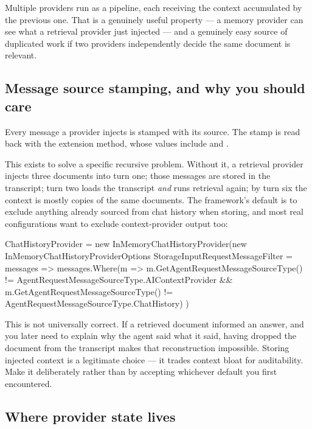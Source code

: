Multiple providers run as a pipeline, each receiving the context accumulated by
the previous one. That is a genuinely useful property --- a memory provider can
see what a retrieval provider just injected --- and a genuinely easy source of
duplicated work if two providers independently decide the same document is
relevant.

\subsection{Message source stamping, and why you should care}

Every message a provider injects is stamped with its source. The stamp is read
back with the  extension method, whose
values include  and .

This exists to solve a specific recursive problem. Without it, a retrieval
provider injects three documents into turn one; those messages are stored in the
transcript; turn two loads the transcript \emph{and} runs retrieval again; by
turn six the context is mostly copies of the same documents. The framework's
default is to exclude anything already sourced from chat history when storing,
and most real configurations want to exclude context-provider output too:

\begin{csharp}[caption={Keeping injected context out of the transcript}, label={lst:source-filter}]
ChatHistoryProvider = new InMemoryChatHistoryProvider(new InMemoryChatHistoryProviderOptions
{
    StorageInputRequestMessageFilter = messages => messages.Where(m =>
        m.GetAgentRequestMessageSourceType() != AgentRequestMessageSourceType.AIContextProvider &&
        m.GetAgentRequestMessageSourceType() != AgentRequestMessageSourceType.ChatHistory)
})
\end{csharp}

\begin{note}
This is not universally correct. If a retrieved document informed an answer, and
you later need to explain why the agent said what it said, having dropped the
document from the transcript makes that reconstruction impossible. Storing
injected context is a legitimate choice --- it trades context bloat for
auditability. Make it deliberately rather than by accepting whichever default you
first encountered.
\end{note}

\subsection{Where provider state lives}

